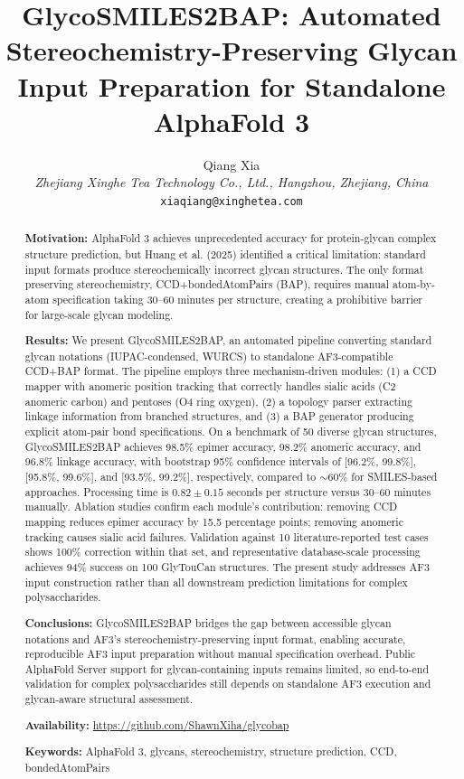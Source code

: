 \documentclass[11pt,a4paper]{article}
\title{GlycoSMILES2BAP: Automated Stereochemistry-Preserving Glycan Input Preparation for Standalone AlphaFold 3}
\author{Qiang Xia\\
\textit{Zhejiang Xinghe Tea Technology Co., Ltd., Hangzhou, Zhejiang, China}\\
\texttt{xiaqiang@xinghetea.com}}
\date{}
\begin{document}
\maketitle

\begin{abstract}
\noindent\textbf{Motivation:} AlphaFold 3 achieves unprecedented accuracy for protein-glycan complex structure prediction, but Huang et al. (2025) identified a critical limitation: standard input formats produce stereochemically incorrect glycan structures. The only format preserving stereochemistry, CCD+bondedAtomPairs (BAP), requires manual atom-by-atom specification taking 30--60 minutes per structure, creating a prohibitive barrier for large-scale glycan modeling.

\noindent\textbf{Results:} We present GlycoSMILES2BAP, an automated pipeline converting standard glycan notations (IUPAC-condensed, WURCS) to standalone AF3-compatible CCD+BAP format. The pipeline employs three mechanism-driven modules: (1) a CCD mapper with anomeric position tracking that correctly handles sialic acids (C2 anomeric carbon) and pentoses (O4 ring oxygen), (2) a topology parser extracting linkage information from branched structures, and (3) a BAP generator producing explicit atom-pair bond specifications. On a benchmark of 50 diverse glycan structures, GlycoSMILES2BAP achieves 98.5\% epimer accuracy, 98.2\% anomeric accuracy, and 96.8\% linkage accuracy, with bootstrap 95\% confidence intervals of [96.2\%, 99.8\%], [95.8\%, 99.6\%], and [93.5\%, 99.2\%], respectively, compared to $\sim$60\% for SMILES-based approaches. Processing time is $0.82 \pm 0.15$ seconds per structure versus 30--60 minutes manually. Ablation studies confirm each module's contribution: removing CCD mapping reduces epimer accuracy by 15.5 percentage points; removing anomeric tracking causes sialic acid failures. Validation against 10 literature-reported test cases shows 100\% correction within that set, and representative database-scale processing achieves 94\% success on 100 GlyTouCan structures. The present study addresses AF3 input construction rather than all downstream prediction limitations for complex polysaccharides.

\noindent\textbf{Conclusions:} GlycoSMILES2BAP bridges the gap between accessible glycan notations and AF3's stereochemistry-preserving input format, enabling accurate, reproducible AF3 input preparation without manual specification overhead. Public AlphaFold Server support for glycan-containing inputs remains limited, so end-to-end validation for complex polysaccharides still depends on standalone AF3 execution and glycan-aware structural assessment.

\noindent\textbf{Availability:} \url{https://github.com/ShawnXiha/glycobap}

\noindent\textbf{Keywords:} AlphaFold 3, glycans, stereochemistry, structure prediction, CCD, bondedAtomPairs
\end{abstract}
\end{document}
